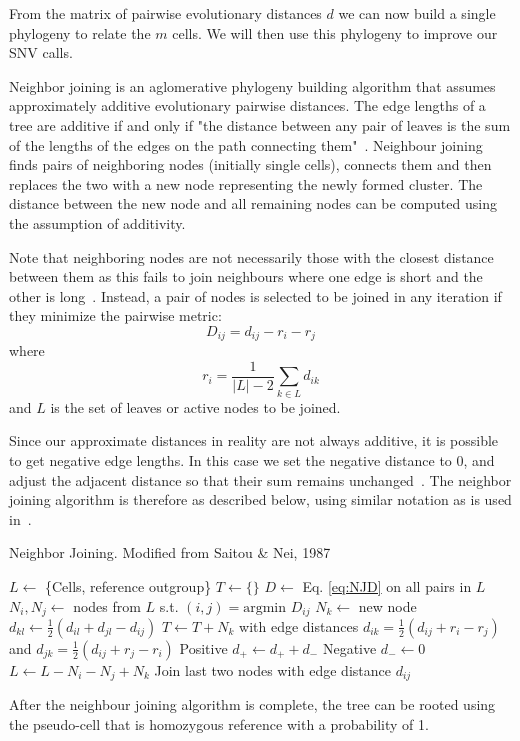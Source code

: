 \documentclass[../../main.tex]{subfiles}
\begin{document}
From the matrix of pairwise evolutionary distances $d$ we can now build a single phylogeny to relate the $m$ cells.
We will then use this phylogeny to improve our SNV calls.

Neighbor joining is an aglomerative phylogeny building algorithm that assumes approximately additive evolutionary pairwise distances.
The edge lengths of a tree are additive if and only if "the distance between any pair of leaves is the sum of the lengths of the edges on the path connecting them"~\cite{BSA}.
Neighbour joining finds pairs of neighboring nodes (initially single cells), connects them and then replaces the two with a new node representing the newly formed cluster.
The distance between the new node and all remaining nodes can be computed using the assumption of additivity.

Note that neighboring nodes are not necessarily those with the closest distance between them as this fails to join neighbours where one edge is short and the other is long~\cite{NJ, BSA}.
Instead, a pair of nodes is selected to be joined in any iteration if they minimize the pairwise metric:
\begin{equation}\label{eq:NJD}
    D_{ij} = d_{ij} - r_i - r_j
\end{equation}
where
\begin{equation*}
    r_i = \frac{1}{|L|-2}\sum_{k\in L}d_{ik}
\end{equation*}
and $L$ is the set of leaves or active nodes to be joined.

Since our approximate distances in reality are not always additive, it is possible to get negative edge lengths.
In this case we set the negative distance to 0, and adjust the adjacent distance so that their sum remains unchanged~\cite{negedge}.
The neighbor joining algorithm is therefore as described below, using similar notation as is used in~\cite{BSA}.

\begin{algorithm}
    \caption{Neighbor Joining. Modified from Saitou \& Nei, 1987}
    \begin{algorithmic}[5]
        \State $L\gets$ \{Cells, reference outgroup\}
        \State $T\gets\{\}$
            \State $D\gets$ Eq. \eqref{eq:NJD} on all pairs in $L$
            \State $N_i,N_j\gets$ nodes from $L$ s.t. $(i,j) = \text{argmin } D_{ij}$
            \State $N_k \gets$ new node
                \State $d_{kl} \gets \frac{1}{2}\left(d_{il} + d_{jl} - d_{ij}\right)$
            \EndFor
            \State $T \gets T + N_k$ with edge distances $d_{ik} = \frac{1}{2}\left(d_{ij}+r_i-r_j\right)$ and $d_{jk} = \frac{1}{2}\left(d_{ij}+r_j-r_i\right)$
                \State Positive $d_+\gets d_+ + d_-$ 
                \State Negative $d_-\gets 0$ 
            \EndIf
            \State $L \gets L -N_i -N_j + N_k$
        \EndWhile
        \State Join last two nodes with edge distance $d_{ij}$
    \end{algorithmic}
\end{algorithm}

After the neighbour joining algorithm is complete, the tree can be rooted using the pseudo-cell that is homozygous reference with a probability of 1.
\end{document}

